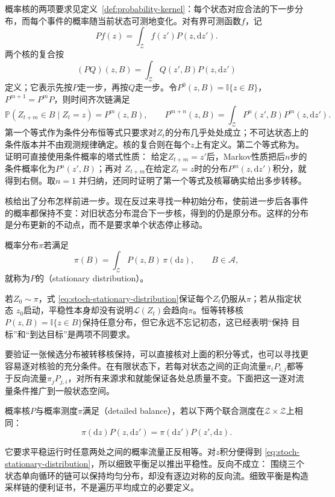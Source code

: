 概率核的两项要求见定义~\ref{def:probability-kernel}：每个状态对应合法的下一步分布，而每个事件的概率随当前状态可测地变化。对有界可测函数$f$，记
\[
  Pf(z)=\int_{\mathcal{Z}}f(z')P(z,\mathrm{d}z').
\]
两个核的复合按
\[
  (PQ)(z,B)
  =
  \int_{\mathcal{Z}}Q(z',B)P(z,\mathrm{d}z')
\]
定义；它表示先按$P$走一步，再按$Q$走一步。令$P^0(z,B)=\mathbb{I}\{z\in B\}$，
$P^{m+1}=P^mP$，则时间齐次链满足
\begin{equation}
  \mathbb{P}(Z_{t+m}\in B\mid Z_t=z)=P^m(z,B),
  \qquad
  P^{m+n}(z,B)
  =
  \int_{\mathcal{Z}}P^n(z',B)P^m(z,\mathrm{d}z').
  \label{eq:stoch-chapman-kolmogorov}
\end{equation}
第一个等式作为条件分布恒等式只要求对\(Z_t\)的分布几乎处处成立；不可达状态上的条件版本并不由观测规律确定。核的复合则在每个\(z\)上有定义。第二个等式称为。证明可直接使用条件概率的塔式性质：
给定$Z_{t+m}=z'$后，Markov性质把后$n$步的条件概率化为$P^n(z',B)$；再对
$Z_{t+m}$在给定$Z_t=z$时的分布$P^m(z,\mathrm{d}z')$积分，就得到右侧。取$n=1$
并归纳，还同时证明了第一个等式及核幂确实给出多步转移。

核给出了分布怎样前进一步。现在反过来寻找一种初始分布，使前进一步后各事件的概率都保持不变：对旧状态分布混合下一步核，得到的仍是原分布。这样的分布是分布更新的不动点，而不是要求单个状态停止移动。
\begin{definition}[平稳分布]
  \label{def:stoch-stationary-distribution}
概率分布$\pi$若满足
\begin{equation}
  \pi(B)=\int_{\mathcal{Z}}P(z,B)\,\pi(\mathrm{d}z),
  \qquad B\in\mathcal{A},
  \label{eq:stoch-stationary-distribution}
\end{equation}
就称为$P$的（stationary distribution）。
\end{definition}
若$Z_0\sim\pi$，式
\eqref{eq:stoch-stationary-distribution}保证每个$Z_t$仍服从$\pi$；若从指定状态
$z_0$启动，平稳性本身却没有说明$\mathcal{L}(Z_t)$会趋向$\pi$。恒等转移核
$P(z,B)=\mathbb{I}\{z\in B\}$保持任意分布，但它永远不忘记初态，这已经表明“保持
目标”和“到达目标”是两项不同要求。

要验证一张候选分布被转移核保持，可以直接核对上面的积分等式，也可以寻找更容易逐对核验的充分条件。在有限状态下，若每对状态之间的正向流量\(\pi_iP_{i,j}\)都等于反向流量\(\pi_jP_{j,i}\)，对所有来源求和就能保证各处总质量不变。下面把这一逐对流量条件推广到一般状态空间。
\begin{definition}[细致平衡]
  \label{def:stoch-detailed-balance}
概率核\(P\)与概率测度\(\pi\)满足（detailed balance），若以下两个联合测度在\(\mathcal Z\times\mathcal Z\)上相同：
\begin{equation}
  \pi(\mathrm{d}z)P(z,\mathrm{d}z')
  =\pi(\mathrm{d}z')P(z',\mathrm{d}z).
  \label{eq:stoch-detailed-balance}
\end{equation}
\end{definition}
它要求平稳运行时任意两处之间的概率流量正反相等。对$z$积分便得到
\eqref{eq:stoch-stationary-distribution}，所以细致平衡足以推出平稳性。反向不成立：
围绕三个状态单向循环的链可以保持均匀分布，却没有逐边对称的反向流。细致平衡是构造
采样链的便利证书，不是遍历平均成立的必要定义。

